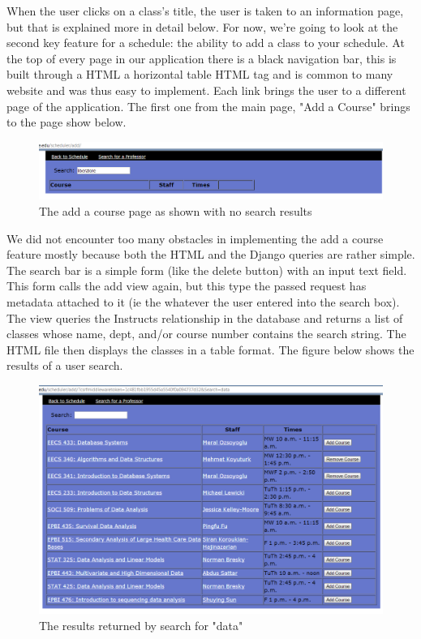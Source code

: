 \documentclass[pdftex,12pt,letter]{article}
\begin{document}
When the user clicks on a class's title, the user is taken to an information page, but that is explained more in detail below. For now, we're going to look at the second key feature for a schedule: the ability to add a class to your schedule. At the top of every page in our application there is a black navigation bar, this is built through a HTML a horizontal table HTML tag and is common to many website and was thus easy to implement. Each link brings the user to a different page of the application. The first one from the main page, "Add a Course" brings to the page show below.
\begin{figure}
\includegraphics[width=6in]{blankAdd.png}
\caption{The add a course page as shown with no search results}
\end{figure}
\FloatBarrier
We did not encounter too many obstacles in implementing the add a course feature mostly because both the HTML and the Django queries are rather simple. The search bar is a simple form (like the delete button) with an input text field. This form calls the add view again, but this type the passed request has metadata attached to it (ie the whatever the user entered into the search box). The view queries the Instructs relationship in the database and returns a list of classes whose name, dept, and/or course number contains the search string. The HTML file then displays the classes in a table format. The figure below shows the results of a user search.
\begin{figure}
\includegraphics[width=6in]{dataResults.png}
\caption{The results returned by search for "data"}
\end{figure}
\end{document}
